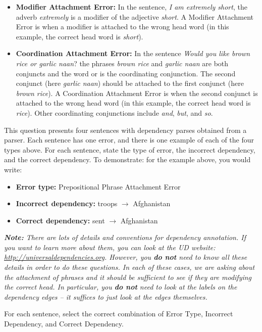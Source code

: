 \begin{enumerate}[1.]
\begin{itemize}
\item {\bf Modifier Attachment Error:} In the sentence, {\em I am extremely short}, the adverb {\em extremely} is a modifier of the adjective {\em short}. A Modifier Attachment Error is when a modifier is attached to the wrong head word (in this example, the correct head word is {\em short}).
 
\item {\bf Coordination Attachment Error:} In the sentence {\em Would you like brown rice or garlic naan}? the phrases {\em brown rice} and {\em garlic naan} are both conjuncts and the word or is the coordinating conjunction. The second conjunct (here {\em garlic naan}) should be attached to the first conjunct (here {\em brown rice}). A Coordination Attachment Error is when the second conjunct is attached to the wrong head word (in this example, the correct head word is {\em rice}). Other coordinating conjunctions include {\em and}, {\em but}, and {\em so}.
\end{itemize}

This question presents four sentences with dependency parses obtained from a parser. Each sentence has one error, and there is one example of each of the four types above. For each sentence, state the type of error, the incorrect dependency, and the correct dependency. To demonstrate: for the example above, you would write: 

\begin{itemize}
\item {\bf Error type:} Prepositional Phrase Attachment Error 
\item {\bf Incorrect dependency:} troops $\rightarrow$ Afghanistan 
\item {\bf Correct dependency:} sent $\rightarrow$ Afghanistan
\end{itemize}

{\em {\bf Note:}  There are lots of details and conventions for dependency annotation. If you want to learn more about them, you can look at the UD website: \url{http://universaldependencies.org}. However, you {\bf do not} need to know all these details in order to do these questions. In each of these cases, we are asking about the attachment of phrases and it should be sufficient to see if they are modifying the correct head. In particular, you {\bf do not} need to look at the labels on the dependency edges -- it suffices to just look at the edges themselves.}

For each sentence, select the correct combination of Error Type, Incorrect Dependency, and Correct Dependency.


\end{enumerate}
